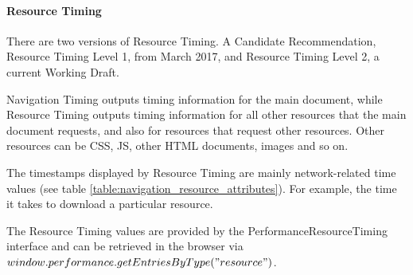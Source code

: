 


\paragraph{Resource Timing} %


There are two versions of Resource Timing.
A Candidate Recommendation, Resource Timing Level 1, from March 2017, %
and Resource Timing Level 2, a current Working Draft. %

Navigation Timing outputs timing information for the main document, while Resource Timing outputs timing information for all other resources that the main document requests, and also for resources that request other resources.
Other resources can be CSS, JS, other HTML documents, images and so on.

The timestamps displayed by Resource Timing are mainly network-related time values (see table \ref{table:navigation_resource_attributes}).
For example, the time it takes to download a particular resource.


The Resource Timing values are provided by the PerformanceResourceTiming interface and can be retrieved in the browser via $window.performance.getEntriesByType("resource")$.


